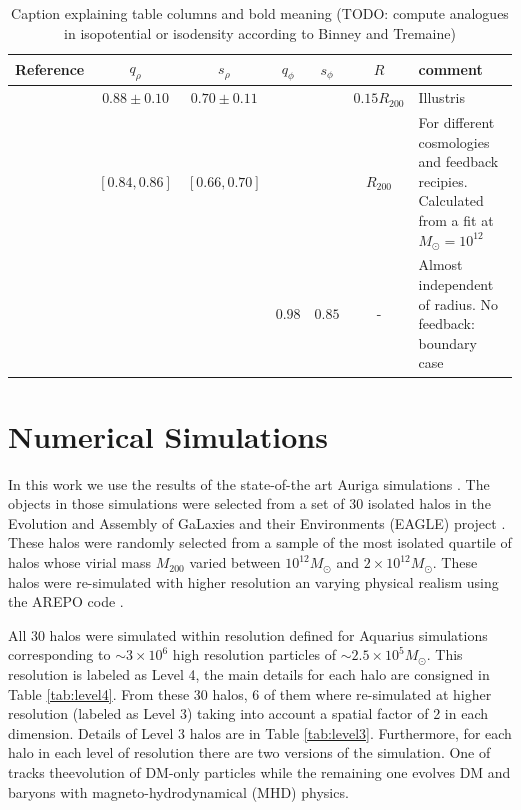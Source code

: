 \documentclass[a4paper,fleqn,usenatbib]{mnras}
\begin{document}
\begin{table}
\begin{tabular}{|l|cc|cc|c|p{4cm}|}\hline
Reference&$q_{\rho}$&$s_{\rho}$&$q_{\phi}$&$s_{\phi}$&$R$&comment\\ \hline \hline
\citet{Chua_et_al._2018}&$\mathbf{0.88\pm0.10}$&$\mathbf{0.70\pm0.11}$&&&$0.15R_{200}$& Illustris\\\hline
%
\citet{Bryan_et_al._2013}&$\mathbf{[0.84,0.86]}$&$\mathbf{[0.66,0.70]}$&&&$R_{200}$& For different cosmologies and feedback recipies. Calculated from a fit at $M_\odot=10^12$\\\hline
%
\multirow{2}{*}{\citet{Abadi_et_al._2010}}&&&$\mathbf{0.98}$&$\mathbf{0.85}$&-& Almost independent of radius. No feedback: boundary case\\\hline
\end{tabular}
\caption{Caption explaining table columns and bold meaning (TODO: compute analogues in isopotential or isodensity according to Binney and Tremaine)}
\end{table}




\section{Numerical Simulations}

In this work we use the results of the state-of-the art Auriga
simulations \citep{auriga}. 
The objects in those simulations were selected from a set of 30 isolated halos in
the Evolution and Assembly of GaLaxies and their Environments (EAGLE)
project \citep{Eagle}. 
These halos were randomly selected from a sample of the most isolated
quartile of halos whose virial mass $M_{200}$ varied between
$10^{12}M_\odot$ and $2\times 10^{12}M_\odot$. 
These halos were re-simulated with higher resolution an varying
physical realism using the AREPO code \citep{arepo}.
 
All 30 halos were simulated within resolution defined for Aquarius
simulations corresponding to $\sim 3\times 10^6$ high resolution particles of $\sim 2.5 \times 10^5
M_\odot$.  
This resolution is labeled as Level 4, the main details for each halo
are consigned in Table \ref{tab:level4}. 
From these 30 halos, 6 of them where re-simulated at higher resolution
(labeled as Level 3) taking into account a spatial factor of 2 in each
dimension.   
Details of Level 3 halos are in Table \ref{tab:level3}. 
Furthermore, for each halo in each level of resolution there are two
versions of the simulation. 
One of tracks theevolution of DM-only particles while the remaining
one evolves DM and baryons with magneto-hydrodynamical (MHD) physics. 
\end{document}
